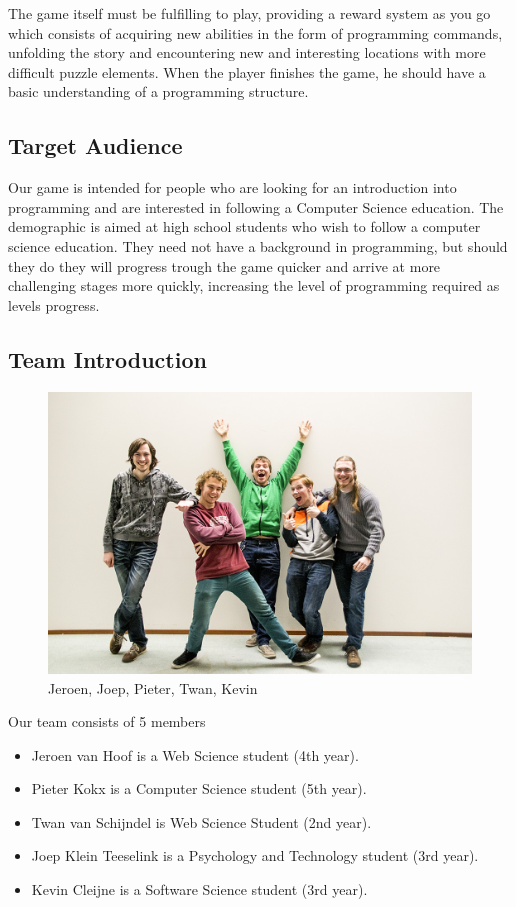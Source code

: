 \documentclass[a4paper,twoside,12pt]{article}
\begin{document}
The game itself must be fulfilling to play, providing a reward system as you go which consists of acquiring new abilities in the form of programming commands, unfolding the story and encountering new and interesting locations with more difficult puzzle elements. When the player finishes the game, he should have a basic understanding of a programming structure.


\subsection{Target Audience}
Our game is intended for people who are looking for an introduction into programming and are interested in following a Computer Science education.
The demographic is aimed at high school students who wish to follow a computer science education. They need not have a background in programming, but should they do they will progress trough the game quicker and arrive at more challenging stages more quickly, increasing the level of programming required as levels progress.

\subsection{Team Introduction}
\begin{figure}[H]
\centering
\includegraphics[scale=0.4]{group}
\caption{Jeroen, Joep, Pieter, Twan, Kevin}
\end{figure}
Our team consists of 5 members

\begin{itemize}
\item Jeroen van Hoof is a Web Science student (4th year).
\item Pieter Kokx is a Computer Science student (5th year).
\item Twan van Schijndel is Web Science Student (2nd year).
\item Joep Klein Teeselink is a Psychology and Technology student (3rd year).
\item Kevin Cleijne is a Software Science student (3rd year).
\end{itemize}
\end{document}
